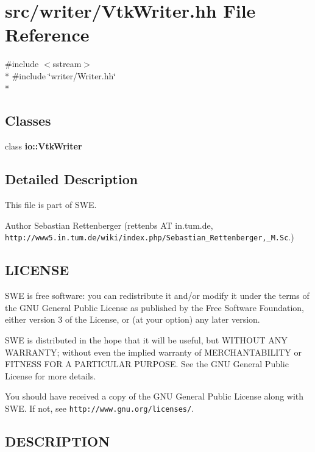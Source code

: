 \section{src/writer/\-Vtk\-Writer.hh File Reference}
\label{VtkWriter_8hh}
{\ttfamily \#include $<$sstream$>$}\\*
{\ttfamily \#include \char`\"{}writer/\-Writer.\-hh\char`\"{}}\\*
\subsection*{Classes}
\begin{DoxyCompactItemize}
\item 
class {\bf io\-::\-Vtk\-Writer}
\end{DoxyCompactItemize}


\subsection{Detailed Description}
This file is part of S\-W\-E.

\begin{DoxyAuthor}{Author}
Sebastian Rettenberger (rettenbs A\-T in.\-tum.\-de, {\tt http\-://www5.\-in.\-tum.\-de/wiki/index.\-php/\-Sebastian\-\_\-\-Rettenberger,\-\_\-\-M.\-Sc}.)
\end{DoxyAuthor}
\subsection{L\-I\-C\-E\-N\-S\-E}\label{Writer_8hh_LICENSE}
S\-W\-E is free software\-: you can redistribute it and/or modify it under the terms of the G\-N\-U General Public License as published by the Free Software Foundation, either version 3 of the License, or (at your option) any later version.

S\-W\-E is distributed in the hope that it will be useful, but W\-I\-T\-H\-O\-U\-T A\-N\-Y W\-A\-R\-R\-A\-N\-T\-Y; without even the implied warranty of M\-E\-R\-C\-H\-A\-N\-T\-A\-B\-I\-L\-I\-T\-Y or F\-I\-T\-N\-E\-S\-S F\-O\-R A P\-A\-R\-T\-I\-C\-U\-L\-A\-R P\-U\-R\-P\-O\-S\-E. See the G\-N\-U General Public License for more details.

You should have received a copy of the G\-N\-U General Public License along with S\-W\-E. If not, see {\tt http\-://www.\-gnu.\-org/licenses/}.\subsection{D\-E\-S\-C\-R\-I\-P\-T\-I\-O\-N}\label{NetCdfWriter_8hh_DESCRIPTION}
